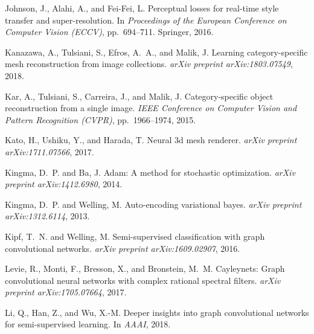 \documentclass{article}
\begin{document}
\begin{thebibliography}{59}
Johnson, J., Alahi, A., and Fei-Fei, L.
\newblock Perceptual losses for real-time style transfer and super-resolution.
\newblock In \emph{Proceedings of the European Conference on Computer Vision
  (ECCV)}, pp.\  694--711. Springer, 2016.

Kanazawa, A., Tulsiani, S., Efros, A.~A., and Malik, J.
\newblock Learning category-specific mesh reconstruction from image
  collections.
\newblock \emph{arXiv preprint arXiv:1803.07549}, 2018.

Kar, A., Tulsiani, S., Carreira, J., and Malik, J.
\newblock Category-specific object reconstruction from a single image.
\newblock \emph{IEEE Conference on Computer Vision and Pattern Recognition
  (CVPR)}, pp.\  1966--1974, 2015.

Kato, H., Ushiku, Y., and Harada, T.
\newblock Neural 3d mesh renderer.
\newblock \emph{arXiv preprint arXiv:1711.07566}, 2017.

Kingma, D.~P. and Ba, J.
\newblock Adam: A method for stochastic optimization.
\newblock \emph{arXiv preprint arXiv:1412.6980}, 2014.

Kingma, D.~P. and Welling, M.
\newblock Auto-encoding variational bayes.
\newblock \emph{arXiv preprint arXiv:1312.6114}, 2013.

Kipf, T.~N. and Welling, M.
\newblock Semi-supervised classification with graph convolutional networks.
\newblock \emph{arXiv preprint arXiv:1609.02907}, 2016.

Levie, R., Monti, F., Bresson, X., and Bronstein, M.~M.
\newblock Cayleynets: Graph convolutional neural networks with complex rational
  spectral filters.
\newblock \emph{arXiv preprint arXiv:1705.07664}, 2017.

Li, Q., Han, Z., and Wu, X.-M.
\newblock Deeper insights into graph convolutional networks for semi-supervised
  learning.
\newblock In \emph{AAAI}, 2018.


\end{thebibliography}
\end{document}
